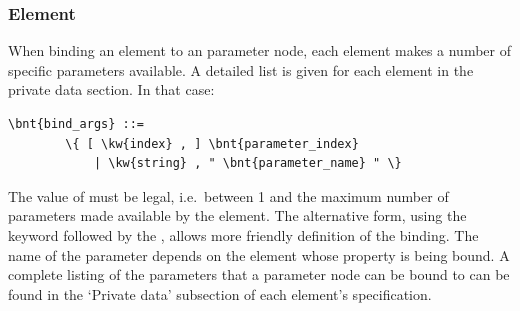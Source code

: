 \subsubsection{Element}
When binding an element to an 
 parameter node,
each element makes a number of specific parameters available.
A detailed list is given for each element in the private data section.
In that case:
\begin{Verbatim}[commandchars=\\\{\}]
    \bnt{bind_args} ::=
        \{ [ \kw{index} , ] \bnt{parameter_index}
            | \kw{string} , " \bnt{parameter_name} " \}
\end{Verbatim}
The value of  must be legal, i.e.\ between 1 and the
maximum number of parameters made available by the element.
The alternative form, using the keyword  followed by
the , allows more friendly definition of the binding.
The name of the parameter depends on the element whose property
is being bound.
A complete listing of the parameters that a parameter node 
can be bound to can be found in the `Private data' subsection
of each element's specification.

